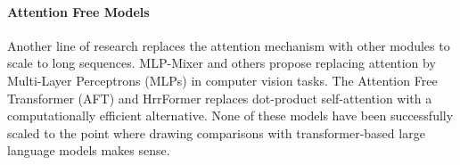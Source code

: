 \documentclass[11pt]{article}
\begin{document}






\paragraph{Attention Free Models} %
Another line of research replaces the attention mechanism with other modules to scale to long sequences. MLP-Mixer and others \cite{DBLP:journals/corr/abs-2105-01601, liu2021pay} propose replacing attention by Multi-Layer Perceptrons (MLPs) in computer vision tasks. The Attention Free Transformer (AFT) \citep{zhai2021attention} and HrrFormer \citep{alam2023recasting} replaces dot-product self-attention with a computationally efficient alternative. None of these models have been successfully scaled to the point where drawing comparisons with transformer-based large language models makes sense.
\end{document}
